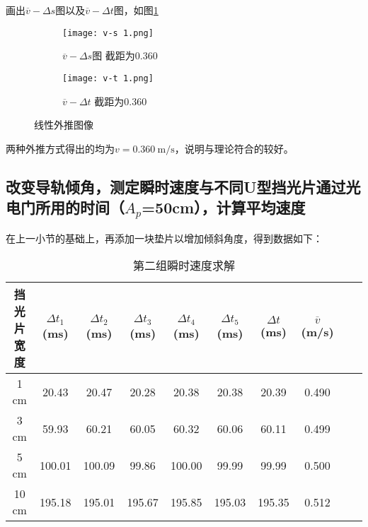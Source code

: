 \documentclass[11pt]{article}
\begin{document}
	画出$\overline{v}-\Delta s$图以及$\overline{v}-\Delta t$图，如图\ref{fig:v1}
	\begin{figure}[H]
		\centering
		\begin{subfigure}[t]{0.45\textwidth}  %
			\centering
			\texttt{[image: v-s 1.png]}  %
			\caption{$\overline{v}-\Delta s$图 \quad 截距为0.360}
		\end{subfigure}
		\begin{subfigure}[t]{0.45\textwidth}  %
			\centering
			\texttt{[image: v-t 1.png]}  %
			\caption{$\overline{v}-\Delta t$ \quad 截距为0.360}
		\end{subfigure}
		\caption{线性外推图像}
		\label{fig:v1}
	\end{figure}
	
	两种外推方式得出的均为$v=0.360 \ \mathrm{m/s}$，说明与理论符合的较好。
	
	
	\subsection{改变导轨倾角，测定瞬时速度与不同U型挡光片通过光电门所用的时间（$A_p$=50cm），计算平均速度}
	在上一小节的基础上，再添加一块垫片以增加倾斜角度，得到数据如下：
	\begin{table}[H]\centering
		\caption{第二组瞬时速度求解}
		\begin{tabular}{cccccccccc}\toprule
			挡光片宽度 & $\Delta t_1$ (ms) & $\Delta t_2$ (ms) & $\Delta t_3$ (ms) & $\Delta t_4$ (ms) & $\Delta t_5$ (ms) & $\Delta t$ (ms) & $\overline{v}$ (m/s)  \\
			\midrule
			1 cm   &20.43       &20.47  &20.28  &20.38  &20.38  &20.39  &0.490 \\       
			3  cm  &59.93   &60.21  &60.05  &60.32  &60.06  &60.11  &0.499 \\        
			5  cm  &100.01  &100.09 &99.86  &100.00 &99.99  &99.99  &0.500 \\        
			10  cm &195.18  &195.01 &195.67 &195.85 &195.03 &195.35 &0.512 \\        
			\bottomrule
		\end{tabular}
	\end{table}
	
\end{document}
